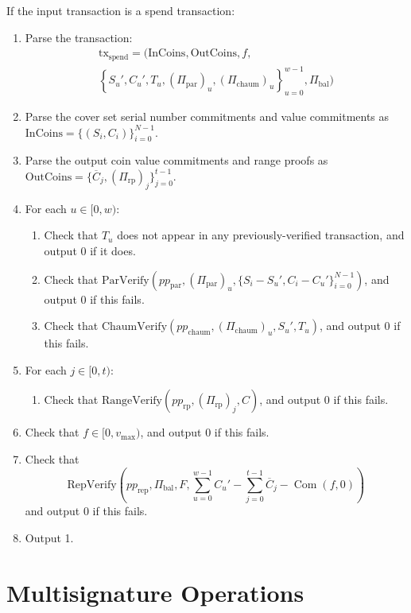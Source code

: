 \documentclass{llncs}
\newcommand{\com}{\operatorname{Com}}
\begin{document}
If the input transaction is a spend transaction:
\begin{enumerate}
    \item Parse the transaction:
    \begin{multline*}
    \text{tx}_{\text{spend}} = ( \text{InCoins}, \text{OutCoins}, f, \\
    \left\{ S_u', C_u', T_u, (\Pi_{\text{par}})_u, (\Pi_{\text{chaum}})_u \right\}_{u=0}^{w-1}, \Pi_{\text{bal}} )
    \end{multline*}
    \item Parse the cover set serial number commitments and value commitments as $\text{InCoins} = \{(S_i, C_i)\}_{i=0}^{N-1}$.
    \item Parse the output coin value commitments and range proofs as $\text{OutCoins} = \{ \overline{C}_j, (\Pi_{\text{rp}})_j \}_{j=0}^{t-1}$.
    \item For each $u \in [0,w):$
    \begin{enumerate}
        \item Check that $T_u$ does not appear in any previously-verified transaction, and output 0 if it does.
        \item Check that $\text{ParVerify}(pp_{\text{par}},(\Pi_{\text{par}})_u,\{S_i - S_u',C_i - C_u'\}_{i=0}^{N-1})$, and output 0 if this fails.
        \item Check that $\text{ChaumVerify}(pp_{\text{chaum}},(\Pi_{\text{chaum}})_u,S_u',T_u)$, and output 0 if this fails.
    \end{enumerate}
    \item For each $j \in [0,t):$
    \begin{enumerate}
        \item Check that $\text{RangeVerify}(pp_{\text{rp}},(\Pi_{\text{rp}})_j,C)$, and output 0 if this fails.
    \end{enumerate}
    \item Check that $f \in [0,v_{\text{max}})$, and output 0 if this fails.
    \item Check that $$\text{RepVerify}\left( pp_{\text{rep}}, \Pi_{\text{bal}}, F, \sum_{u=0}^{w-1} C_u' - \sum_{j=0}^{t-1} \overline{C}_j - \com(f,0) \right)$$ and output 0 if this fails.
    \item Output 1.
\end{enumerate}


\section{Multisignature Operations}
\end{document}
